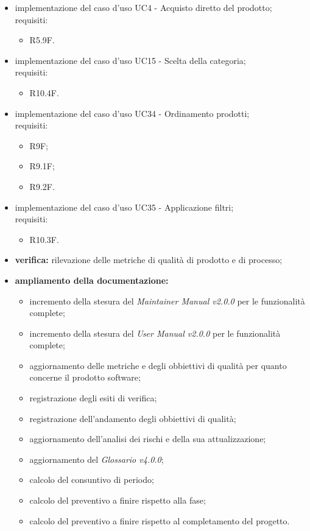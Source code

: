 \begin{itemize}
    \item implementazione del caso d'uso UC4 - Acquisto diretto del prodotto;\\requisiti:
          \begin{itemize}
              \item R5.9F.
          \end{itemize}
    \item implementazione del caso d'uso UC15 - Scelta della categoria;\\requisiti:
          \begin{itemize}
              \item R10.4F.
          \end{itemize}
    \item implementazione del caso d'uso UC34 - Ordinamento prodotti;\\requisiti:
          \begin{itemize}
              \item R9F;
              \item R9.1F;
              \item R9.2F.
          \end{itemize}
    \item implementazione del caso d'uso UC35 - Applicazione filtri;\\requisiti:
          \begin{itemize}
              \item R10.3F.
          \end{itemize}
    \item \textbf{verifica:} rilevazione delle metriche di qualità di prodotto e di processo;
    \item \textbf{ampliamento della documentazione:}
          \begin{itemize}
              \item incremento della stesura del \textit{Maintainer Manual v2.0.0} per le funzionalità complete;
              \item incremento della stesura del \textit{User Manual v2.0.0} per le funzionalità complete;
              \item aggiornamento delle metriche e degli obbiettivi di qualità per quanto concerne il prodotto software;
              \item registrazione degli esiti di verifica;
              \item registrazione dell'andamento degli obbiettivi di qualità;
              \item aggiornamento dell'analisi dei rischi e della sua attualizzazione;
              \item aggiornamento del \textit{Glossario v4.0.0};
              \item calcolo del consuntivo di periodo;
              \item calcolo del preventivo a finire rispetto alla fase;
              \item calcolo del preventivo a finire rispetto al completamento del progetto.
          \end{itemize}
\end{itemize}
